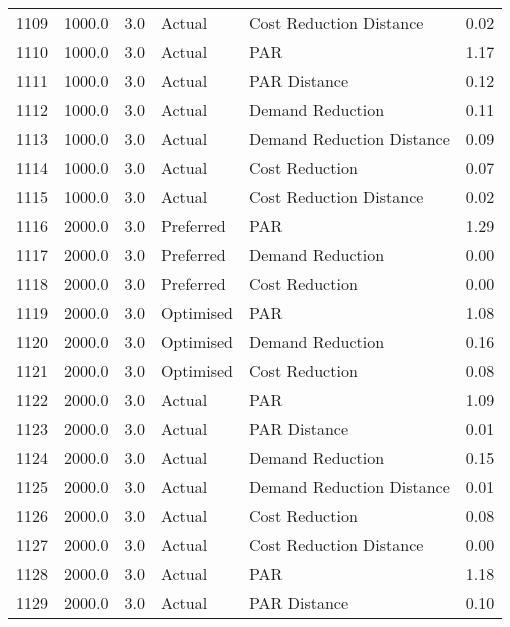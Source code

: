 \begin{longtable}{lrrllr}
1109 &       1000.0 &     3.0 &         Actual &    Cost Reduction Distance &   0.02 \\
1110 &       1000.0 &     3.0 &         Actual &                        PAR &   1.17 \\
1111 &       1000.0 &     3.0 &         Actual &               PAR Distance &   0.12 \\
1112 &       1000.0 &     3.0 &         Actual &           Demand Reduction &   0.11 \\
1113 &       1000.0 &     3.0 &         Actual &  Demand Reduction Distance &   0.09 \\
1114 &       1000.0 &     3.0 &         Actual &             Cost Reduction &   0.07 \\
1115 &       1000.0 &     3.0 &         Actual &    Cost Reduction Distance &   0.02 \\
1116 &       2000.0 &     3.0 &      Preferred &                        PAR &   1.29 \\
1117 &       2000.0 &     3.0 &      Preferred &           Demand Reduction &   0.00 \\
1118 &       2000.0 &     3.0 &      Preferred &             Cost Reduction &   0.00 \\
1119 &       2000.0 &     3.0 &      Optimised &                        PAR &   1.08 \\
1120 &       2000.0 &     3.0 &      Optimised &           Demand Reduction &   0.16 \\
1121 &       2000.0 &     3.0 &      Optimised &             Cost Reduction &   0.08 \\
1122 &       2000.0 &     3.0 &         Actual &                        PAR &   1.09 \\
1123 &       2000.0 &     3.0 &         Actual &               PAR Distance &   0.01 \\
1124 &       2000.0 &     3.0 &         Actual &           Demand Reduction &   0.15 \\
1125 &       2000.0 &     3.0 &         Actual &  Demand Reduction Distance &   0.01 \\
1126 &       2000.0 &     3.0 &         Actual &             Cost Reduction &   0.08 \\
1127 &       2000.0 &     3.0 &         Actual &    Cost Reduction Distance &   0.00 \\
1128 &       2000.0 &     3.0 &         Actual &                        PAR &   1.18 \\
1129 &       2000.0 &     3.0 &         Actual &               PAR Distance &   0.10 \\

\end{longtable}
